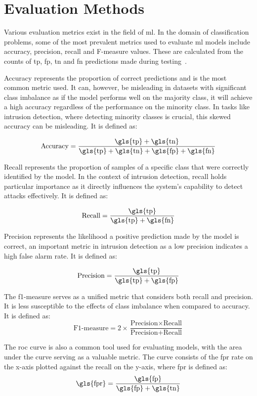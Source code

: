 \section{Evaluation Methods}%
\label{sec:eval}

Various evaluation metrics exist in the field of \gls{ml}. In the domain of
classification problems, some of the most prevalent metrics used to evaluate
\gls{ml} models include accuracy, precision, recall and F-measure values. These
are calculated from the counts of \gls{tp}, \gls{fp}, \gls{tn} and \gls{fn}
predictions made during testing~\cite{metrics}.

Accuracy represents the proportion of correct predictions and is the most
common metric used. It can, however, be misleading in datasets with significant
class imbalance as if the model performs well on the majority class, it will
achieve a high accuracy regardless of the performance on the minority class. In
tasks like intrusion detection, where detecting minority classes is crucial,
this skewed accuracy can be misleading. It is defined as:

\[ \text{Accuracy} = \frac{\text{\gls{tp}}+\text{\gls{tn}}}{\text{\gls{tp}}+\text{\gls{tn}}+\text{\gls{fp}}+\text{\gls{fn}}} \]

Recall represents the proportion of samples of a specific class that were
correctly identified by the model. In the context of intrusion detection,
recall holds particular importance as it directly influences the system's
capability to detect attacks effectively. It is defined as:

\[ \text{Recall} = \frac{\text{\gls{tp}}}{\text{\gls{tp}}+\text{\gls{fn}}} \]

Precision represents the likelihood a positive prediction made by the model is
correct, an important metric in intrusion detection as a low precision
indicates a high false alarm rate. It is defined as:

\[ \text{Precision} = \frac{\text{\gls{tp}}}{\text{\gls{tp}}+\text{\gls{fp}}}
\]

The f1-measure serves as a unified metric that considers both recall and
precision. It is less susceptible to the effects of class imbalance when
compared to accuracy. It is defined as:
\[ \text{F1-measure} = 2 \times \frac{\text{Precision} \times
        \text{Recall}}{\text{Precision} + \text{Recall}} \]

The \gls{roc} curve is also a common tool used for evaluating models, with the
area under the curve serving as a valuable metric. The curve consists of the
\gls{fpr} rate on the x-axis plotted against the recall on the y-axis, where
\gls{fpr} is defined as:
\[ \text{\gls{fpr}} = \frac{\text{\gls{fp}}}{\text{\gls{fp}} + \text{\gls{tn}}}
\]

